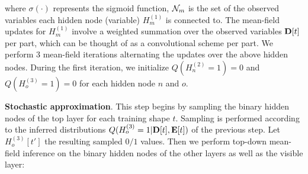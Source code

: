where $\sigma(\cdot)$ represents the sigmoid function, $\mathcal{N}_m$ is the set of the observed variables each hidden node (variable) $H_m^{(1)}$ is connected to. The mean-field updates for $H_m^{(1)}$ involve a weighted summation over the observed variables $\mathbf{D}[t]$ per part, which can be thought of as a convolutional scheme per part. We perform $3$ mean-field iterations alternating the updates over the above hidden nodes. During the first iteration, we initialize $Q( H_n^{(2)} = 1 )=0$ and $Q( H_o^{(3)} = 1 ) = 0$ for each hidden node $n$ and $o$. 

\textbf{Stochastic approximation}. This step begins by sampling the binary hidden nodes of the top layer for each training shape $t$. Sampling is performed according to the inferred distributions $Q( H_o^{(3)} = 1 | \mathbf{D}[t], \mathbf{E}[t] )$ of the previous step. Let $H_o^{(3)}[t']$ the resulting sampled $0/1$ values. Then we perform top-down mean-field inference on the binary hidden nodes of the other layers as well as the visible layer: 

